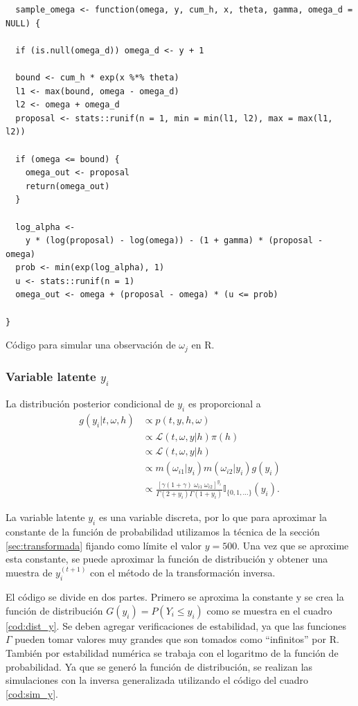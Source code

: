 \documentclass[11pt,a4paper]{article}
\begin{document}
\begin{table}[!htb]
\begin{lstlisting}
  sample_omega <- function(omega, y, cum_h, x, theta, gamma, omega_d = NULL) {

  if (is.null(omega_d)) omega_d <- y + 1

  bound <- cum_h * exp(x %*% theta)
  l1 <- max(bound, omega - omega_d)
  l2 <- omega + omega_d
  proposal <- stats::runif(n = 1, min = min(l1, l2), max = max(l1, l2))

  if (omega <= bound) {
    omega_out <- proposal
    return(omega_out)
  }

  log_alpha <-
    y * (log(proposal) - log(omega)) - (1 + gamma) * (proposal - omega)
  prob <- min(exp(log_alpha), 1)
  u <- stats::runif(n = 1)
  omega_out <- omega + (proposal - omega) * (u <= prob)

}
\end{lstlisting}
\caption{Código para simular una observación de $\omega_j$ en R.}
\label{cod:sim_omega}
\end{table}


\subsubsection*{Variable latente $y_i$}
\label{posterior_y}

La distribución posterior condicional de $y_i$ es proporcional a
\begin{align*}
g(y_i | t, \omega, h) &\propto p(t, y, h, \omega)\\
&\propto \mathcal{L}(t, \omega, y |h) \pi(h)\\
&\propto \mathcal{L}(t, \omega, y |h)\\
&\propto m(\omega_{i1}|y_i)m(\omega_{i2}|y_i)g(y_i)\\
&\propto \frac{\left[\gamma (1+\gamma) \ \omega_{i1} \ \omega_{i2}\right]^{y_i}}{\Gamma(2+y_i)\Gamma(1+y_i)}\mathbb{I}_{\lbrace 0, 1, \dots \rbrace}(y_i).
\end{align*}

La variable latente $y_i$ es una variable discreta, por lo que para aproximar la constante de la función de probabilidad utilizamos la técnica de la sección \ref{sec:transformada} fijando como límite el valor $y = 500$. Una vez que se aproxime esta constante, se puede aproximar la función de distribución y obtener una muestra de $y_i^{(t+1)}$ con el método de la transformación inversa.

El código se divide en dos partes. Primero se aproxima la constante y se crea la función de distribución $G(y_i) = P(Y_i \leq y_i)$ como se muestra en el cuadro \ref{cod:dist_y}. Se deben agregar verificaciones de estabilidad, ya que las funciones $\Gamma$ pueden tomar valores muy grandes que son tomados como ``infinitos'' por R. También por estabilidad numérica se trabaja con el logaritmo de la función de probabilidad. Ya que se generó la función de distribución, se realizan las simulaciones con la inversa generalizada utilizando el código del cuadro \ref{cod:sim_y}.
\end{document}
